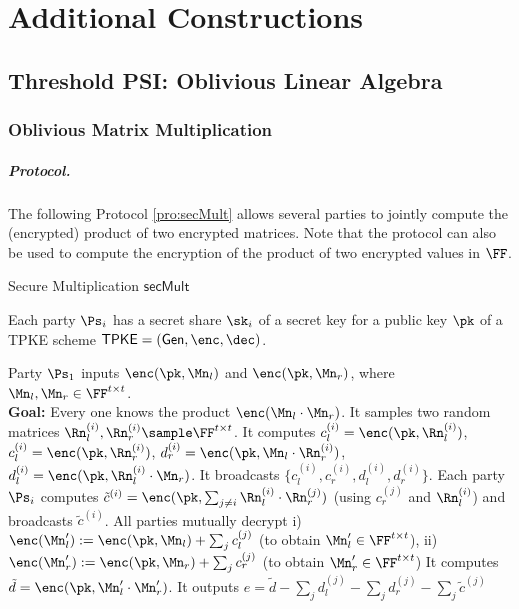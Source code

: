\chapter{Additional Constructions}
\label{AppendixA}

\section{Threshold PSI: Oblivious Linear Algebra}
\label{sec:oblLinearAlg}

\subsection{Oblivious Matrix Multiplication}
 \label{appen:OMM}
 
\paragraph{Protocol.} The following Protocol \ref{pro:secMult} allows several parties to jointly compute the (encrypted) product of two encrypted matrices. Note that the protocol can also be used to compute the encryption of the product of two encrypted values in $\FF$.


\begin{algorithm}
\caption{Secure Multiplication $\mathsf{secMult}$}
\label{pro:secMult}
\begin{algorithmic}[1]
\REQUIRE Each party $\Ps_i$ has a secret share $\sk_i$ of a secret key for a public key $\pk$ of a TPKE scheme $\mathsf{TPKE}=(\mathsf{Gen},\enc,\dec)$.

\ENSURE Party $\Ps_1$ inputs $\enc(\pk,\Mn_l)$ and $ \enc(\pk,\Mn_r)$, where $\Mn_l,\Mn_r\in\FF^{t\times t}$.\\

\textbf{Goal: } Every one knows the product $\enc(\Mn_l\cdot\Mn_r)$.
    \STATE It samples two random matrices $\Rn_l^{(i)},\Rn_r^{(i)}\sample \FF^{t\times t}$.
    \STATE It computes $c_l^{(i)}=\enc(\pk, \Rn^{(i)}_l)$, $c_l^{(i)}=\enc(\pk,\Rn^{(i)}_r)$, $ d_{r}^{(i)}=\enc(\pk,\Mn_l\cdot\Rn^{(i)}_r)$,  $d_l^{(i)}=\enc(\pk,\Rn^{(i)}_l\cdot\Mn_r)$.
    \STATE It broadcasts $\{c_l^{(i)},c_r^{(i)},d_l^{(i)},d_r^{(i)}\}$.
\ENDFOR
 \STATE Each party $\Ps_i$ computes $\tilde c^{(i)}=\enc(\pk,\sum_{j\neq i} \Rn^{(i)}_l\cdot \Rn^{(j)}_r)$ (using $c_r^{(j)}$ and $\Rn^{(i)}_l$) and broadcasts $\tilde c^{(i)}$.
\STATE All parties mutually decrypt i) $\enc(\Mn_l'):=\enc(\pk,\Mn_l)+\sum_j c_l^{(j)} $ (to obtain $\Mn_l'\in\FF^{t\times t}$), ii) $\enc(\Mn_r'):=\enc(\pk,\Mn_r)+\sum_j c_r^{(j)}$ (to obtain $\Mn_r'\in\FF^{t\times t}$)
\STATE It  computes $\tilde d = \enc(\pk,\Mn_l'\cdot \Mn_r')$.
\STATE It outputs $e=\tilde d-\sum_j d_{l}^{(j)}-\sum_j d_{r}^{(j)} -\sum_j \tilde c^{(j)}$
\ENDFOR
\end{algorithmic}
\end{algorithm}


